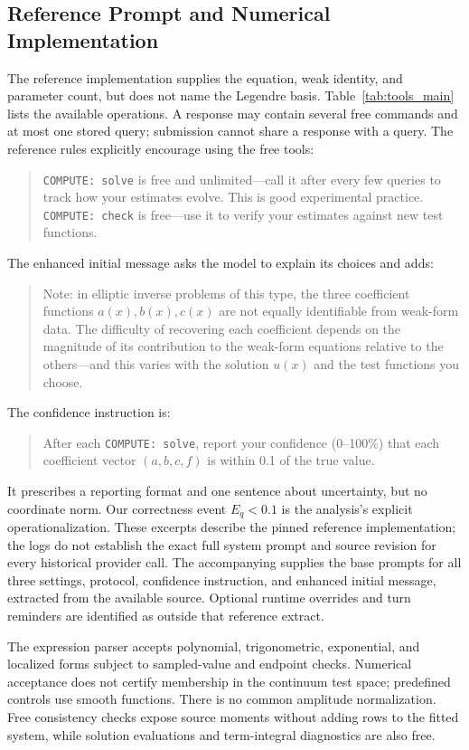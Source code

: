 \documentclass{article}
\begin{document}
\subsection{Reference Prompt and Numerical Implementation}
\label{app:prompt}

The reference implementation supplies the equation, weak identity, and parameter
count, but does not name the Legendre basis. Table~\ref{tab:tools_main} lists the
available operations. A response may contain several free commands and at most
one stored query; submission cannot share a response with a query. The reference
rules explicitly encourage using the free tools:
\begin{quote}\small
\texttt{COMPUTE: solve} is free and unlimited---call it after every few queries
to track how your estimates evolve. This is good experimental practice.
\texttt{COMPUTE: check} is free---use it to verify your estimates against new
test functions.
\end{quote}
The enhanced initial message asks the model to explain its choices and adds:
\begin{quote}\small
Note: in elliptic inverse problems of this type, the three coefficient functions
\(a(x),b(x),c(x)\) are not equally identifiable from weak-form data. The
difficulty of recovering each coefficient depends on the magnitude of its
contribution to the weak-form equations relative to the others---and this varies
with the solution \(u(x)\) and the test functions you choose.
\end{quote}
The confidence instruction is:
\begin{quote}\small
After each \texttt{COMPUTE: solve}, report your confidence (0--100\%) that each
coefficient vector \((a,b,c,f)\) is within 0.1 of the true value.
\end{quote}
It prescribes a reporting format and one sentence about uncertainty, but no
coordinate norm. Our correctness event \(E_q<0.1\) is the analysis's explicit
operationalization. These excerpts describe the pinned reference implementation;
the logs do not establish the exact full system prompt and source revision for
every historical provider call. The accompanying
 supplies the base prompts for all three
settings, protocol, confidence instruction, and enhanced initial message,
extracted from the available source. Optional runtime overrides and turn
reminders are identified as outside that reference extract.

The expression parser accepts polynomial, trigonometric, exponential, and
localized forms subject to sampled-value and endpoint checks. Numerical
acceptance does not certify membership in the continuum test space; predefined
controls use smooth functions. There is no common amplitude normalization.
Free consistency checks expose source moments without adding rows to the fitted
system, while solution evaluations and term-integral diagnostics are also free.
\end{document}
